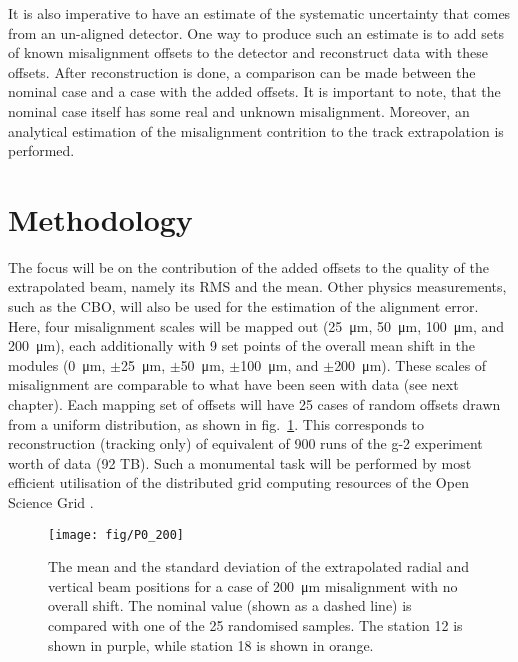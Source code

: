 \documentclass[a4paper,11pt]{article}
\begin{document}
It is also imperative to have an estimate of the systematic uncertainty that comes from an un-aligned detector. One way to produce such an estimate is to add sets of known misalignment offsets to the detector and reconstruct data with these offsets. After reconstruction is done, a comparison can be made between the nominal case and a case with the added offsets. It is important to note, that the nominal case itself has some real and unknown misalignment. Moreover, an analytical estimation of the misalignment contrition to the track extrapolation is performed. 


\section{Methodology}  

The focus will be on the contribution of the added offsets to the quality of the extrapolated beam, namely its RMS and the mean. Other physics measurements, such as the CBO, will also be used for the estimation of the alignment error. Here, four misalignment scales will be mapped out (\SI{25}{\micro\metre}, \SI{50}{\micro\metre}, \SI{100}{\micro\metre}, and \SI{200}{\micro\metre}), each additionally with 9 set points of the overall mean shift in the modules (\SI{0}{\micro\metre}, $\pm$\SI{25}{\micro\metre},  $\pm$\SI{50}{\micro\metre},  $\pm$\SI{100}{\micro\metre}, and $\pm$\SI{200}{\micro\metre}). These scales of misalignment are comparable to what have been seen with data (see next chapter). Each mapping set of offsets will have 25 cases of random offsets drawn from a uniform distribution, as shown in fig.~\ref{fig:P0_200}. This corresponds to reconstruction (tracking only) of equivalent of 900 runs of the g-2 experiment worth of data (92 TB). Such a monumental task will be performed by most efficient utilisation of the distributed grid computing resources of the Open Science Grid \cite{OSG}.

\begin{figure}[ht!]
    \centering
    \texttt{[image: fig/P0\_200]}
    \vspace{-8pt}
    \caption{The mean and the standard deviation of the extrapolated radial and vertical beam positions for a case of \SI{200}{\micro\meter} misalignment with no overall shift. The nominal value (shown as a dashed line) is compared with one of the 25 randomised samples. The station 12 is shown in purple, while station 18 is shown in orange.}
    \label{fig:P0_200}
\end{figure}
\end{document}
